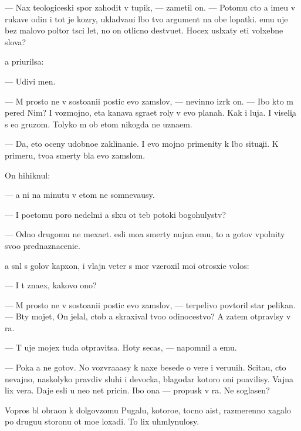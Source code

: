 \documentclass[10pt]{book}
\begin{document}
— Nax teologiceski{\y} spor zahodit v tupik, — zametil on. — Potomu cto {\y}a ime{\y}u v rukave odin i tot je koz{\yi}ry, uklad{\yi}va{\y}u{\x}i{\y} l{\iu}bo{\y} tvo{\y} argument na obe lopatki. {\Y}emu uje bez malovo poltor{\yi} t{\yi}s{\ia}ci let, no on otlicno de{\y}stvu{\y}et. Hocex usl{\yi}xaty eti volxebn{\yi}{\y}e slova?

{\Y}a pri{\x}urilsa:

— Udivi men{\ia}.

— M{\yi} prosto ne v sosto{\y}ani{\y}i postic {\Y}evo zam{\yi}slov, — nevinno izr{\e}k on. — Ibo kto m{\yi} pered Nim? I vozmojno, eta kanava s{\yi}gra{\y}et roly v {\Y}evo planah. Kak i luja. I viseli{\c}a s {\y}e{\y}o gruzom. Tolyko m{\yi} ob etom nikogda ne uzna{\y}em.

— Da, eto oceny udobno{\y}e zaklinani{\y}e. I {\y}evo mojno primenity k l{\iu}bo{\y} situa{\c}i{\y}i. K primeru, tvo{\y}a smerty b{\yi}la {\y}evo zam{\yi}slom.

On hihiknul:

— {\Y}a ni na minutu v etom ne somneva{\y}usy.

— I poetomu poro{\y} nedel{\ia}mi {\y}a sl{\yi}xu ot teb{\ia} potoki bogohulystv?

— Odno drugomu ne mexa{\y}et. {\Y}esli mo{\y}a smerty nujna {\Y}emu, to {\y}a gotov v{\yi}polnity svo{\y}o prednaznaceni{\y}e.

{\Y}a sn{\ia}l s golov{\yi} kap{\iu}xon, i vlajn{\yi}{\y} veter s mor{\ia} vz{\y}eroxil mo{\y}i otrosxi{\y}e volos{\yi}:

— I t{\yi} zna{\y}ex, kakovo ono?

— M{\yi} prosto ne v sosto{\y}ani{\y}i postic {\Y}evo zam{\yi}slov, — terpelivo povtoril star{\yi}{\y} pelikan. — B{\yi}ty mojet, On jelal, ctob{\yi} {\y}a skraxival tvo{\y}o odinocestvo? A zatem otpravl{\iu}sy v ra{\y}.

— T{\yi} uje mojex tuda otpravitsa. Hoty se{\y}cas, — napomnil {\y}a {\y}emu.

— Poka {\y}a ne gotov. No vozvra{\x}a{\y}asy k naxe{\y} besede o vere i veru{\y}u{\x}ih. Scita{\y}u, cto nevajno, naskolyko pravdiv{\yi} sluhi i devocka, blagodar{\ia} kotoro{\y} oni po{\y}avilisy. Vajna lix vera. Daje {\y}esli u ne{\y}o net pricin{\yi}. Ibo ona — propusk v ra{\y}. Ne soglasen?

Vopros b{\yi}l obra{\x}on k dolgov{\ia}zomu Pugalu, kotoro{\y}e, tocno aist, razmerenno xagalo po drugu{\y}u storonu ot mo{\y}e{\y} loxadi. To lix uhm{\yi}lynulosy.
\end{document}
